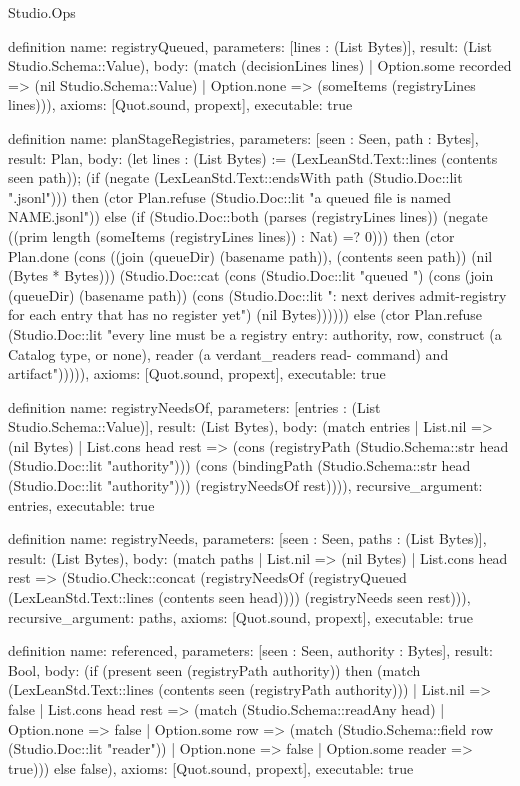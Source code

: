 \begin{lexlean}{Studio.Ops}
\begin{semanticmodule}
{definition{
  name: registryQueued,
  parameters: [lines : (List Bytes)],
  result: (List Studio.Schema::Value),
  body: (match (decisionLines lines)
    | Option.some recorded => (nil Studio.Schema::Value)
    | Option.none => (someItems (registryLines lines))),
  axioms: [Quot.sound, propext],
  executable: true
}

definition{
  name: planStageRegistries,
  parameters: [seen : Seen, path : Bytes],
  result: Plan,
  body: (let lines : (List Bytes) := (LexLeanStd.Text::lines (contents seen path)); (if (negate (LexLeanStd.Text::endsWith path (Studio.Doc::lit ".jsonl"))) then (ctor Plan.refuse (Studio.Doc::lit "a queued file is named NAME.jsonl\n")) else (if (Studio.Doc::both (parses (registryLines lines)) (negate ((prim length (someItems (registryLines lines)) : Nat) =? 0))) then (ctor Plan.done (cons ((join (queueDir) (basename path)), (contents seen path)) (nil (Bytes * Bytes))) (Studio.Doc::cat (cons (Studio.Doc::lit "queued ") (cons (join (queueDir) (basename path)) (cons (Studio.Doc::lit ": next derives admit-registry for each entry that has no register yet\n") (nil Bytes)))))) else (ctor Plan.refuse (Studio.Doc::lit "every line must be a registry entry: authority, row, construct (a Catalog type, or none), reader (a verdant_readers read- command) and artifact\n"))))),
  axioms: [Quot.sound, propext],
  executable: true
}

definition{
  name: registryNeedsOf,
  parameters: [entries : (List Studio.Schema::Value)],
  result: (List Bytes),
  body: (match entries
    | List.nil => (nil Bytes)
    | List.cons head rest => (cons (registryPath (Studio.Schema::str head (Studio.Doc::lit "authority"))) (cons (bindingPath (Studio.Schema::str head (Studio.Doc::lit "authority"))) (registryNeedsOf rest)))),
  recursive_argument: entries,
  executable: true
}

definition{
  name: registryNeeds,
  parameters: [seen : Seen, paths : (List Bytes)],
  result: (List Bytes),
  body: (match paths
    | List.nil => (nil Bytes)
    | List.cons head rest => (Studio.Check::concat (registryNeedsOf (registryQueued (LexLeanStd.Text::lines (contents seen head)))) (registryNeeds seen rest))),
  recursive_argument: paths,
  axioms: [Quot.sound, propext],
  executable: true
}

definition{
  name: referenced,
  parameters: [seen : Seen, authority : Bytes],
  result: Bool,
  body: (if (present seen (registryPath authority)) then (match (LexLeanStd.Text::lines (contents seen (registryPath authority)))
    | List.nil => false
    | List.cons head rest => (match (Studio.Schema::readAny head)
      | Option.none => false
      | Option.some row => (match (Studio.Schema::field row (Studio.Doc::lit "reader"))
        | Option.none => false
        | Option.some reader => true))) else false),
  axioms: [Quot.sound, propext],
  executable: true
}

}
\end{semanticmodule}
\end{lexlean}
